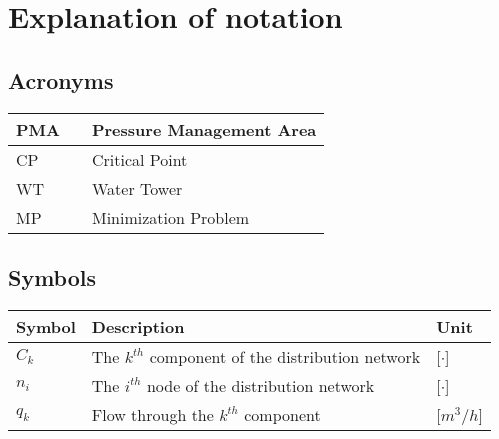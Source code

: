 \chapter{Explanation of notation}

\section*{Acronyms}
	
	\begin{tabular}{|l c l|} \hline
		PMA 		&&	Pressure Management Area		\\ \hline
		CP			&&	Critical Point					\\ \hline
		WT			&&	Water Tower						\\ \hline
		MP		  	&&	Minimization Problem			\\ \hline
	\end{tabular}

\section*{Symbols}


\begin{tabular}{l l l} 
	\textbf{Symbol}	&	\textbf{Description}							& \textbf{Unit}	\\\hline
	$C_k$			&	The $k^{th}$ component of the distribution network     		& [$\cdot$]\\
	$n_i$			&	The $i^{th}$ node of the distribution network     			& [$\cdot$]\\
	$q_k$			&	Flow through the $k^{th}$ component 		     			& [$m^3/h$]\\
\end{tabular}
